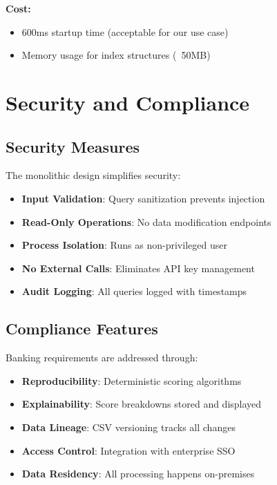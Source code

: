 \textbf{Cost:}
\begin{itemize}[leftmargin=*,itemsep=2pt,topsep=2pt]
  \item 600ms startup time (acceptable for our use case)
  \item Memory usage for index structures (~50MB)
\end{itemize}

\section{Security and Compliance}

\subsection{Security Measures}

The monolithic design simplifies security:

\begin{itemize}[leftmargin=*,itemsep=2pt,topsep=2pt]
  \item \textbf{Input Validation}: Query sanitization prevents injection
  \item \textbf{Read-Only Operations}: No data modification endpoints
  \item \textbf{Process Isolation}: Runs as non-privileged user
  \item \textbf{No External Calls}: Eliminates API key management
  \item \textbf{Audit Logging}: All queries logged with timestamps
\end{itemize}

\subsection{Compliance Features}

Banking requirements are addressed through:

\begin{itemize}[leftmargin=*,itemsep=2pt,topsep=2pt]
  \item \textbf{Reproducibility}: Deterministic scoring algorithms
  \item \textbf{Explainability}: Score breakdowns stored and displayed
  \item \textbf{Data Lineage}: CSV versioning tracks all changes
  \item \textbf{Access Control}: Integration with enterprise SSO
  \item \textbf{Data Residency}: All processing happens on-premises
\end{itemize}

